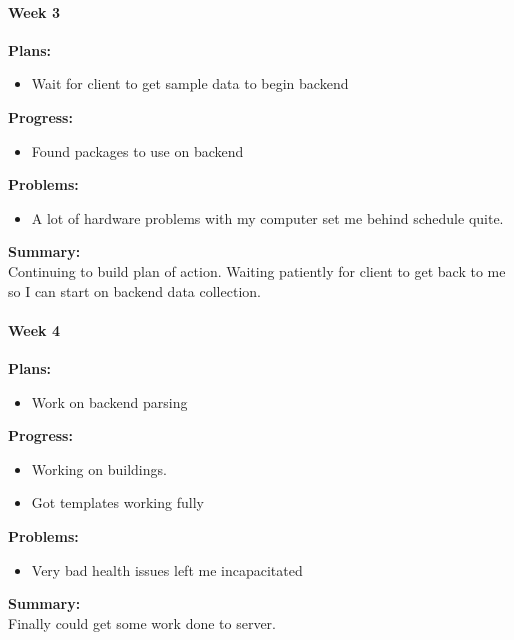 \paragraph{Week 3}
\begin{adjustwidth}{2.5em}{0pt}
    \vspace{-0.5cm}\textbf{Plans:}
    \vspace{-0.5cm}
    \begin{itemize}
        \item Wait for client to get sample data to begin backend 
    \end{itemize} 
    \vspace{-0.3cm}\textbf{Progress:}
    \vspace{-0.5cm}
    \begin{itemize}
        \item Found packages to use on backend 
	\end{itemize} 
    \vspace{-0.3cm}\textbf{Problems:}
    \vspace{-0.5cm}
    \begin{itemize}
        \item A lot of hardware problems with my computer set me behind schedule quite. 
    \end{itemize}  
    \vspace{-0.3cm}\noindent\textbf{Summary:}\\
    \noindent Continuing to build plan of action. Waiting patiently for client to get back to me so I can start on backend data collection.
\end{adjustwidth} 
\paragraph{Week 4}
\begin{adjustwidth}{2.5em}{0pt}
    \vspace{-0.5cm}\textbf{Plans:}
    \vspace{-0.5cm}
    \begin{itemize}
        \item Work on backend parsing
    \end{itemize} 
    \vspace{-0.3cm}\textbf{Progress:}
    \vspace{-0.5cm}
    \begin{itemize}
        \item Working on buildings. 
		\item Got templates working fully  
    \end{itemize} 
    \vspace{-0.3cm}\textbf{Problems:}
    \vspace{-0.5cm}
    \begin{itemize}
        \item Very bad health issues left me incapacitated 
	\end{itemize}  
    \vspace{-0.3cm}\noindent\textbf{Summary:}\\
    \noindent Finally could get some work done to server.
\end{adjustwidth} 
